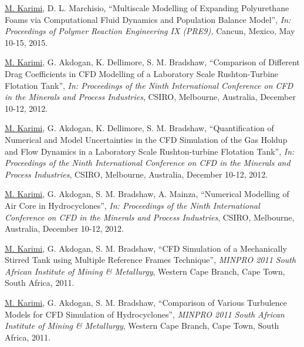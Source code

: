 \documentclass[10pt,a4]{article}
\newcounter{myEnumCounter}
\newcounter{mySaveCounter}
\renewenvironment{enumerate}{%
  \begin{list}{\arabic{myEnumCounter}.}{\usecounter{myEnumCounter}%
  \setcounter{myEnumCounter}{\value{mySaveCounter}}}
  }{%
  \setcounter{mySaveCounter}{\value{myEnumCounter}}\end{list}%
}
\newcommand{\quotes}[1]{``#1''}
\newcommand\myEnumReset{\setcounter{mySaveCounter}{0}}
\begin{document}
\begin{small}
\begin{enumerate}
	\item
\underline{M. Karimi}, D. L. Marchisio, \quotes{Multiscale Modelling of Expanding Polyurethane Foams via Computational Fluid Dynamics and Population Balance Model}, \textit{In: Proceedings of Polymer Reaction Engineering IX (PRE9),} Cancun, Mexico, May 10-15, 2015.


	\item
\underline{M. Karimi}, G. Akdogan, K. Dellimore, S. M. Bradshaw, \quotes{Comparison of Different Drag Coefficients in CFD Modelling of a Laboratory Scale Rushton-Turbine Flotation Tank}, \textit{In: Proceedings of the Ninth International Conference on CFD in the Minerals and Process Industries}, CSIRO, Melbourne, Australia, December 10-12, 2012.
	\item
\underline{M. Karimi}, G. Akdogan, K. Dellimore, S. M. Bradshaw, \quotes{Quantification of Numerical and Model Uncertainties in the CFD Simulation of the Gas Holdup and Flow Dynamics in a Laboratory Scale Rushton-turbine Flotation Tank}, \textit{In: Proceedings of the Ninth International Conference on CFD in the Minerals and Process Industries}, CSIRO, Melbourne, Australia, December 10-12, 2012.
	\item 
\underline{M. Karimi}, G. Akdogan, S. M. Bradshaw, A. Mainza,  \quotes{Numerical Modelling of Air Core in Hydrocyclones}, \textit{In: Proceedings of the Ninth International Conference on CFD in the Minerals and Process Industries}, CSIRO, Melbourne, Australia, December 10-12, 2012.
	\item 
\underline{M. Karimi}, G. Akdogan, S. M. Bradshaw, \quotes{CFD Simulation of a Mechanically Stirred Tank using Multiple Reference Frames Technique}, \textit{MINPRO 2011 South African Institute of Mining \& Metallurgy}, Western Cape Branch, Cape Town, South Africa, 2011.
	\item 
\underline{M. Karimi}, G. Akdogan, S. M. Bradshaw, \quotes{Comparison of Various Turbulence Models for CFD Simulation of Hydrocyclones}, \textit{MINPRO 2011 South African Institute of Mining \& Metallurgy}, Western Cape Branch, Cape Town, South Africa, 2011.

\end{enumerate}


%


\end{small}
\end{document}
